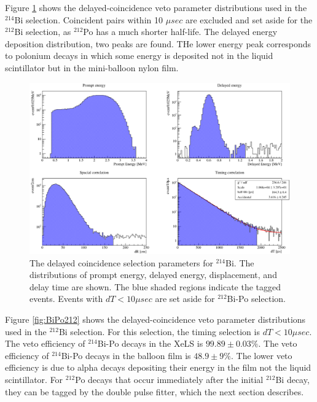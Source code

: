 Figure \ref{fig:BiPo214} shows the delayed-coincidence veto parameter distributions used in the $^{214}$Bi selection. Coincident pairs within 10 $\mu sec$ are excluded and set aside for the $^{212}$Bi selection, as $^{212}$Po has a much shorter half-life. The delayed energy deposition distribution, two peaks are found. THe lower energy peak corresponds to polonium decays in which some energy is deposited not in the liquid scintillator but in the mini-balloon nylon film.
\begin{figure}[htb]
	\centering
	\includegraphics[scale=0.45]{bi214.png}
	\caption{The delayed coincidence selection parameters for $^{214}$Bi. The distributions of prompt energy, delayed energy, displacement, and delay time are shown. The blue shaded regions indicate the tagged events. Events with $dT<10\mu sec$ are set aside for $^{212}$Bi-Po selection.}
	\label{fig:BiPo214}
\end{figure}
Figure \ref{fig:BiPo212} shows the delayed-coincidence veto parameter distributions used in the $^{212}$Bi selection. For this selection, the timing selection is $dT<10\mu sec$. The veto efficiency of $^{214}$Bi-Po decays in the XeLS is $99.89\pm0.03\%$. The veto efficiency of $^{214}$Bi-Po decays in the balloon film is $48.9\pm9\%$. The lower veto efficiency is due to alpha decays depositing their energy in the film not the liquid scintillator. For $^{212}$Po decays that occur immediately after the initial $^{212}$Bi decay, they can be tagged by the double pulse fitter, which the next section describes.
